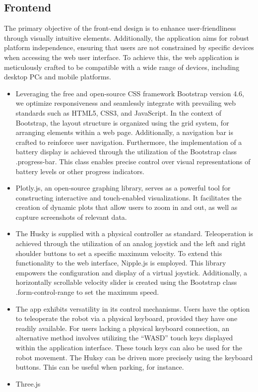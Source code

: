 \documentclass[conference]{IEEEtran}
\begin{document}
\subsection{Frontend}
The primary objective of the front-end design is to enhance user-friendliness through visually intuitive elements. Additionally, the application aims for robust platform independence, ensuring that users are not constrained by specific devices when accessing the web user interface. 
To achieve this, the web application is meticulously crafted to be compatible with a wide range of devices, including desktop PCs and mobile platforms. 
\begin{itemize}
\item Leveraging the free and open-source CSS framework Bootstrap version 4.6, we optimize responsiveness and seamlessly integrate with prevailing web standards such as HTML5, CSS3, and JavaScript. 
In the context of Bootstrap, the layout structure is organized using the grid system, for arranging elements within a web page. 
Additionally, a navigation bar is crafted to reinforce user navigation.
Furthermore, the implementation of a battery display is achieved through the utilization of the Bootstrap class .progress-bar. 
This class enables precise control over visual representations of battery levels or other progress indicators.
\item Plotly.js, an open-source graphing library, serves as a powerful tool for constructing interactive and touch-enabled visualizations. It facilitates the creation of dynamic plots that allow users to zoom in and out, as well as capture screenshots of relevant data.
\item The Husky is supplied with a physical controller as standard. Teleoperation is achieved through the utilization of an analog joystick and the left and right shoulder buttons to set a specific maximum velocity.
To extend this functionality to the web interface, Nipple.js is employed. This library empowers the configuration and display of a virtual joystick. Additionally, a horizontally scrollable velocity slider is created using the Bootstrap class .form-control-range to set the maximum speed.
\item The app exhibits versatility in its control mechanisms. Users have the option to teleoperate the robot via a physical keyboard, provided they have one readily available. For users lacking a physical keyboard connection, an alternative method involves utilizing the “WASD” touch keys displayed within the application interface. 
These touch keys can also be used for the robot movement. The Huksy can be driven more precisely using the keyboard buttons. This can be useful when parking, for instance.
\item Three.js
\end{itemize}
\end{document}
